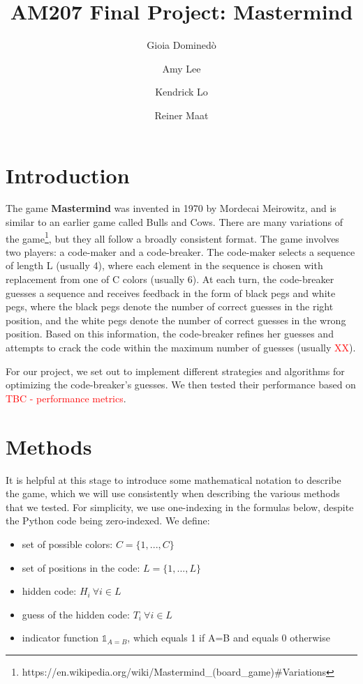 \documentclass[11pt]{article}
\title{AM207 Final Project: Mastermind}
\author{Gioia Domined\`o \and Amy Lee \and Kendrick Lo \and Reiner Maat}
\begin{document}
\maketitle{}


\begin{abstract}
\end{abstract}

\section{Introduction}

The game \textbf{Mastermind} was invented in 1970 by Mordecai Meirowitz, and is similar to an earlier game called Bulls and Cows. There are many variations of the game\footnote{https://en.wikipedia.org/wiki/Mastermind\_(board\_game)\#Variations}, but they all follow a broadly consistent format. The game involves two players: a code-maker and a code-breaker. The code-maker selects a sequence of length L (usually 4), where each element in the sequence is chosen with replacement from one of C colors (usually 6). At each turn, the code-breaker guesses a sequence and receives feedback in the form of black pegs and white pegs, where the black pegs denote the number of correct guesses in the right position, and the white pegs denote the number of correct guesses in the wrong position. Based on this information, the code-breaker refines her guesses and attempts to crack the code within the maximum number of guesses (usually \textcolor{red}{XX}).

For our project, we set out to implement different strategies and algorithms for optimizing the code-breaker's guesses. We then tested their performance based on \textcolor{red}{TBC - performance metrics}.

\section{Methods}

It is helpful at this stage to introduce some mathematical notation to describe the game, which we will use consistently when describing the various methods that we tested. For simplicity, we use one-indexing in the formulas below, despite the Python code being zero-indexed.  We define:
\begin{itemize}
\item set of possible colors: $C = \{1, ..., C\}$
\item set of positions in the code: $L = \{1, ..., L\}$
\item hidden code: $H_i \ \forall i \in L$
\item guess of the hidden code: $T_i \ \forall i \in L$
\item indicator function $\mathbb{1}_{A=B}$, which equals 1 if A=B and equals 0 otherwise
\end{itemize}
\end{document}
